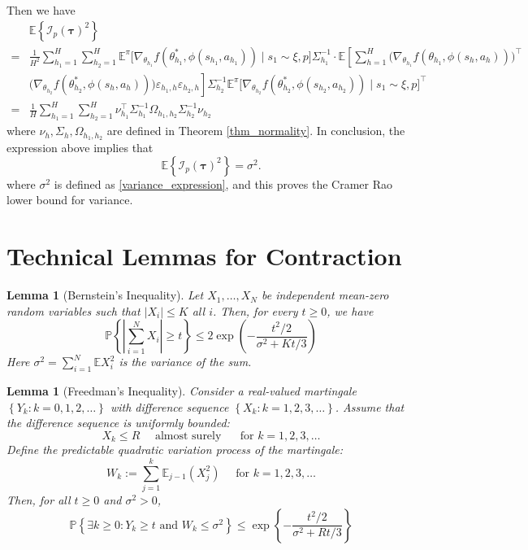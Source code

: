 \documentclass{article}
\numberwithin{equation}{section}
\theoremstyle{plain}
\newtheorem{lemma}[theorem]{Lemma}
\theoremstyle{definition}
\theoremstyle{remark}
\begin{document}
    Then we have
    \begin{align*}
        &\mathbb{E}\left\{\mathcal{I}_p(\boldsymbol{\tau})^2\right\}\\
        =& \frac{1}{H^2} \sum_{h_1 = 1}^H \sum_{h_2 = 1}^H \mathbb{E}^{\pi}\bigg[\nabla_{\theta_{h_1}} f\left(\theta_{h_1}^*, \phi(s_{h_1}, a_{h_1})\right) \mid s_{1} \sim \xi, p\bigg] \Sigma_{h_1}^{-1} \cdot \mathbb{E}\left[\sum_{h=1}^H \bigg(\nabla_{\theta_{h_1}} f(\theta_{h_1},\phi(s_h,a_h))\bigg)^{\top} \right.\\
        & \left.\bigg(\nabla_{\theta_{h_2}} f(\theta_{h_2}^*,\phi(s_h,a_h))\bigg) \varepsilon_{h_1,h} \varepsilon_{h_2,h} \right] \Sigma_{h_2}^{-1} \mathbb{E}^{\pi}\bigg[\nabla_{\theta_{h_2}} f\left(\theta_{h_2}^*, \phi(s_{h_2}, a_{h_2})\right) \mid s_{1} \sim \xi, p\bigg]^{\top}\\
        =& \frac{1}{H}\sum_{h_1 = 1}^H \sum_{h_2 = 1}^H \nu_{h_1}^{\top} \Sigma_{h_1}^{-1} \Omega_{h_1,h_2} \Sigma_{h_2}^{-1} \nu_{h_2}
    \end{align*}
    where $\nu_h, \Sigma_h, \Omega_{h_1,h_2}$ are defined in Theorem \ref{thm_normality}. In conclusion, the expression above implies that
    \begin{equation*}
        \mathbb{E}\left\{\mathcal{I}_p(\boldsymbol{\tau})^2\right\} = \sigma^2.
    \end{equation*}
    where $\sigma^2$ is defined as \eqref{variance_expression}, and this proves the Cramer Rao lower bound for variance.

\section{Technical Lemmas for Contraction}
\begin{lemma}[Bernstein's Inequality]\label{ine_bernstein}
    Let $X_{1}, \ldots, X_{N}$ be independent mean-zero random variables such that $\left|X_{i}\right| \leq K$ all $i$. Then, for every $t \geq 0$, we have
    $$
    \mathbb{P}\left\{\left|\sum_{i=1}^{N} X_{i}\right| \geq t\right\} \leq 2 \exp \left(-\frac{t^{2} / 2}{\sigma^{2}+K t / 3}\right)
    $$
    Here $\sigma^{2}=\sum_{i=1}^{N} \mathbb{E} X_{i}^{2}$ is the variance of the sum.
\end{lemma}

\begin{lemma}[Freedman's Inequality]\label{ine_freedman}
    Consider a real-valued martingale $\left\{Y_{k}: k=0,1,2, \ldots\right\}$ with difference sequence $\left\{X_{k}: k=1,2,3, \ldots\right\}$. Assume that the difference sequence is uniformly bounded:
    $$
    X_{k} \leq R \quad \text { almost surely } \quad \text { for } k=1,2,3, \ldots
    $$
    Define the predictable quadratic variation process of the martingale:
    $$
    W_{k}:=\sum_{j=1}^{k} \mathbb{E}_{j-1}\left(X_{j}^{2}\right) \quad \text { for } k=1,2,3, \ldots
    $$
    Then, for all $t \geq 0$ and $\sigma^{2}>0$,
    $$
    \mathbb{P}\left\{\exists k \geq 0: Y_{k} \geq t \text { and } W_{k} \leq \sigma^{2}\right\} \leq \exp \left\{-\frac{t^{2} / 2}{\sigma^{2}+R t / 3}\right\}
    $$
\end{lemma}
\end{document}
